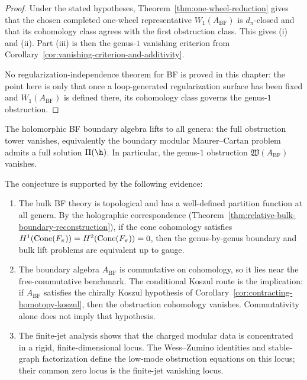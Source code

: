 \begin{proof}
Under the stated hypotheses, Theorem~\ref{thm:one-wheel-reduction} gives that the
chosen completed one-wheel representative $W_1(A_{\mathrm{BF}})$ is $d_\pi$-closed
and that its cohomology class agrees with the first obstruction class. This gives
\textup{(i)} and \textup{(ii)}. Part \textup{(iii)} is then the genus-$1$
vanishing criterion from Corollary~\ref{cor:vanishing-criterion-and-additivity}.

No regularization-independence theorem for BF is proved in this chapter: the point
here is only that once a loop-generated regularization surface has been fixed and
$W_1(A_{\mathrm{BF}})$ is defined there, its cohomology class governs the genus-$1$
obstruction.
\end{proof}

\begin{conjecture}
\label{conj:bf-modular-lifting}
The holomorphic BF boundary algebra lifts to all genera: the full obstruction
tower vanishes, equivalently the boundary modular Maurer--Cartan problem admits
a full solution $\Pi(\h)$. In particular, the genus-$1$ obstruction
$\mathfrak{W}(A_{\mathrm{BF}})$ vanishes.
\end{conjecture}

\begin{remark}
The conjecture is supported by the following evidence:
\begin{enumerate}[label=\textup{(\arabic*)}]
\item The bulk BF theory is topological and has a well-defined partition function at
 all genera. By the holographic correspondence
 (Theorem~\ref{thm:relative-bulk-boundary-reconstruction}), if the cone cohomology
 satisfies $H^1(\operatorname{Cone}(F_\pi)) = H^2(\operatorname{Cone}(F_\pi)) = 0$, then the genus-by-genus
 boundary and bulk lift problems are equivalent up to gauge.
\item The boundary algebra $A_{\mathrm{BF}}$ is commutative on cohomology, so it lies
 near the free-commutative benchmark. The conditional Koszul route is the
 implication: if $A_{\mathrm{BF}}$ satisfies the chirally Koszul hypothesis of
 Corollary~\ref{cor:contracting-homotopy-koszul}, then the obstruction
 cohomology vanishes. Commutativity alone does not imply that hypothesis.
\item The finite-jet analysis shows that the charged modular data is concentrated
 in a rigid, finite-dimensional locus. The Wess--Zumino identities and
 stable-graph factorization define the low-mode obstruction equations on this
 locus; their common zero locus is the finite-jet vanishing locus.
\end{enumerate}
\end{remark}


